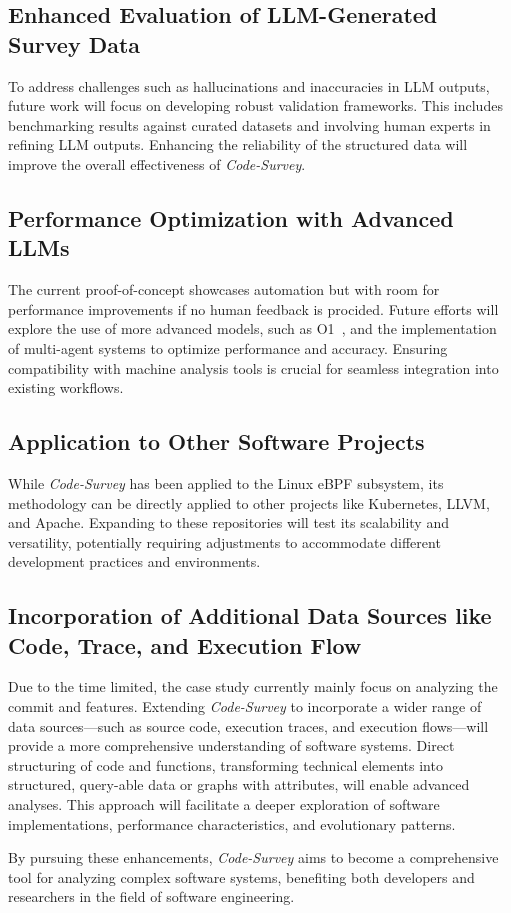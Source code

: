 \subsection{Enhanced Evaluation of LLM-Generated Survey Data}

To address challenges such as hallucinations and inaccuracies in LLM outputs, future work will focus on developing robust validation frameworks. This includes benchmarking results against curated datasets and involving human experts in refining LLM outputs. Enhancing the reliability of the structured data will improve the overall effectiveness of \emph{Code-Survey}.

\subsection{Performance Optimization with Advanced LLMs}

The current proof-of-concept showcases automation but with room for performance improvements if no human feedback is procided. Future efforts will explore the use of more advanced models, such as O1~\cite{o1}, and the implementation of multi-agent systems to optimize performance and accuracy. Ensuring compatibility with machine analysis tools is crucial for seamless integration into existing workflows.

\subsection{Application to Other Software Projects}

While \emph{Code-Survey} has been applied to the Linux eBPF subsystem, its methodology can be directly applied to other projects like Kubernetes, LLVM, and Apache. Expanding to these repositories will test its scalability and versatility, potentially requiring adjustments to accommodate different development practices and environments.

\subsection{Incorporation of Additional Data Sources like Code, Trace, and Execution Flow}

Due to the time limited, the case study currently mainly focus on analyzing the commit and features. Extending \emph{Code-Survey} to incorporate a wider range of data sources—such as source code, execution traces, and execution flows—will provide a more comprehensive understanding of software systems. Direct structuring of code and functions, transforming technical elements into structured, query-able data or graphs with attributes, will enable advanced analyses. This approach will facilitate a deeper exploration of software implementations, performance characteristics, and evolutionary patterns.

By pursuing these enhancements, \emph{Code-Survey} aims to become a comprehensive tool for analyzing complex software systems, benefiting both developers and researchers in the field of software engineering.

% 
% 